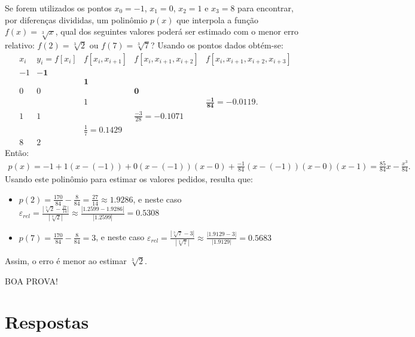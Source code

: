 \documentclass[12pt,a4paper]{article}
\begin{document}
\begin{ExerciseList}
\Exercise[title={2,5}]
Se forem utilizados os pontos $x_0=-1$, $x_1=0$, $x_2=1$ e $x_3=8$ para encontrar, por diferenças divididas, um polinômio $p(x)$ que interpola a função $f(x) = \sqrt[3]{x}$, qual dos seguintes valores poderá ser estimado com o menor erro relativo: $f(2) = \sqrt[3]{2}$ ou $f(7) = \sqrt[3]{7}$?
\Answer Usando os pontos dados obtém-se:
\[
	\begin{array}{cccccc}
   x_i & y_i=f[x_i] & f[x_i,x_{i+1}] & f[x_i,x_{i+1},x_{i+2}]  & f[x_i,x_{i+1},x_{i+2},x_{i+3}] \\
   -1 & \mathbf{-1} \\
	    &     & \mathbf{1} \\
	0 & 0 &             & \mathbf{0}\\
	    &     & 1 &              & \mathbf{\frac{-1}{84}=-0.0119}. \\
	1 & 1 &             & \frac{-3}{28}=-0.1071\\
	    &     & \frac{1}{7}=0.1429\\
	8 & 2
	\end{array}
\]
Então:
\begin{align*}
p(x)
= -1 + 1(x-(-1)) + 0 (x-(-1))(x-0) + \frac{-1}{84}(x-(-1))(x-0)(x-1)
= \frac{85}{84}x - \frac{x^3}{84}.
\end{align*}
Usando este polinômio para estimar os valores pedidos, resulta que:
\begin{itemize}
\item $p(2) = \frac{170}{84} - \frac{8}{84} = \frac{27}{14} \approx 1.9286$, e neste caso $\varepsilon_{rel}
= \frac{ |\sqrt[3]{2} - \frac{27}{14}| }{ |\sqrt[3]{2}| }
\approx \frac{ |1.2599 - 1.9286| }{ |1.2599| } = 0.5308$
\item $p(7) = \frac{170}{84} - \frac{8}{84} = 3$, e neste caso $\varepsilon_{rel}
= \frac{ |\sqrt[3]{7} - 3| }{ |\sqrt[3]{7}| }
\approx \frac{ |1.9129 - 3| }{ |1.9129| } = 0.5683$
\end{itemize}
Assim, o erro é menor ao estimar $\sqrt[3]{2}$.
\end{ExerciseList}

\vspace{0.4cm}
\begin{center}
BOA PROVA!
\end{center}

\newpage
\restoregeometry
\section*{Respostas}
\shipoutAnswer
\end{document}
